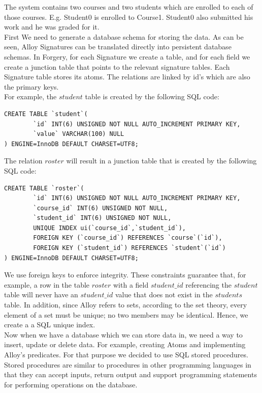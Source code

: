 \documentclass[oneside]{book}
\begin{document}
The system contains two courses and two students which are enrolled to each of those courses. E.g. Student0 is enrolled to Course1. Student0 also submitted his work and he was graded for it.\\

First We need to generate a database schema for storing the data. As can be seen, Alloy Signatures can be translated directly into persistent database schemas. In Forgery, for each Signature we create a table, and for each field we create a junction table that points to the relevant signature tables. Each Signature table stores its atoms. The relations are linked by id's which are also the primary keys.\\

For example, the $student$ table is created by the following SQL code:

\begin{lstlisting}
CREATE TABLE `student`(
        `id` INT(6) UNSIGNED NOT NULL AUTO_INCREMENT PRIMARY KEY,
        `value` VARCHAR(100) NULL
) ENGINE=InnoDB DEFAULT CHARSET=UTF8;
\end{lstlisting}

The relation $roster$ will result in a junction table that is created by the following SQL code:

\begin{lstlisting}
CREATE TABLE `roster`(
        `id` INT(6) UNSIGNED NOT NULL AUTO_INCREMENT PRIMARY KEY,
        `course_id` INT(6) UNSIGNED NOT NULL,
        `student_id` INT(6) UNSIGNED NOT NULL,
        UNIQUE INDEX ui(`course_id`,`student_id`),
        FOREIGN KEY (`course_id`) REFERENCES `course`(`id`),
        FOREIGN KEY (`student_id`) REFERENCES `student`(`id`)
) ENGINE=InnoDB DEFAULT CHARSET=UTF8;
\end{lstlisting}

We use foreign keys to enforce integrity. These constraints guarantee that, for example, a row in the table $roster$ with a field $student\_id$ referencing the $student$ table will never have an $student\_id$ value that does not exist in the $students$ table. In addition, since Alloy refers to sets, according to the set theory, every element of a set must be unique; no two members may be identical. Hence, we create a a SQL unique index.\\

Now when we have a database which we can store data in, we need a way to insert, update or delete data. For example, creating Atoms and implementing Alloy's predicates. For that purpose we decided to use SQL stored procedures. Stored procedures are similar to procedures in other programming languages in that they can accept inputs, return output and support programming statements for performing operations on the database.\\
\end{document}
